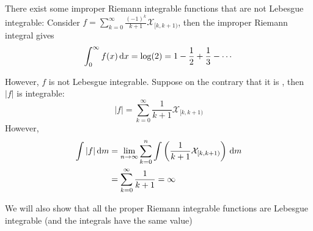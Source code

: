 \begin{example}
There exist some improper Riemann integrable functions that are not Lebesgue integrable:
Consider $f = \sum_{k=0}^\infty \frac{(-1)^k}{k+1}\mathcal{X}_{[k,k+1)}$, then the improper Riemann integral gives 
\[
\int_0^\infty f(x)\,\mathrm{d} x=\log(2) = 1-\frac{1}{2}+\frac{1}{3}-\cdots
\]

However, $f$ is not Lebesgue integrable.
Suppose on the contrary that it is , then $|f|$ is integrable:
\[
|f| = \sum_{k=0}^\infty\frac{1}{k+1}\mathcal{X}_{[k,k+1)}
\]
However,
\begin{align*}
\int|f|\,\mathrm{d} m&=\lim_{n\to\infty}\sum_{k=0}^n\int\left(\frac{1}{k+1}\mathcal{X}_{[k,k+1)}\right)\,\mathrm{d} m\\
&=\sum_{k=0}^\infty\frac{1}{k+1}=\infty
\end{align*}

We will also show that all the proper Riemann integrable functions are Lebesgue integrable (and the integrals have the same value)
\end{example}

